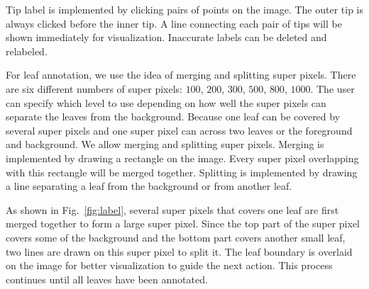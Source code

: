 Tip label is implemented by clicking pairs of points on the image. 
The outer tip is always clicked before the inner tip. 
A line connecting each pair of tips will be shown immediately for visualization. 
Inaccurate labels can be deleted and relabeled. 

For leaf annotation, we use the idea of merging and splitting super pixels. 
There are six different numbers of super pixels: $100$, $200$, $300$, $500$, $800$, $1000$. 
The user can specify which level to use depending on how well the super pixels can separate the leaves from the background. 
Because one leaf can be covered by several super pixels and one super pixel can across two leaves or the foreground and background. 
We allow merging and splitting super pixels. 
Merging is implemented by drawing a rectangle on the image. 
Every super pixel overlapping with this rectangle will be merged together. 
Splitting is implemented by drawing a line separating a leaf from the background or from another leaf. 

As shown in Fig.~\ref{fig:label}, several super pixels that covers one leaf are first merged together to form a large super pixel. 
Since the top part of the super pixel covers some of the background and the bottom part covers another small leaf, two lines are drawn on this super pixel to split it. 
The leaf boundary is overlaid on the image for better visualization to guide the next action. 
This process continues until all leaves have been annotated. 















